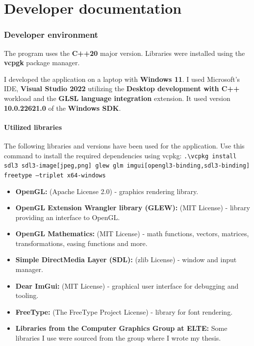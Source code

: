 \part{Developer documentation}
\label{impl}

\section{Developer environment}

The program uses the \textbf{C++20} major version. Libraries were installed using the \textbf{vcpgk} package manager.

I developed the application on a laptop with \textbf{Windows 11}. I used Microsoft's IDE, \textbf{Visual Studio 2022} utilizing the \textbf{Desktop development with C++} workload and the \textbf{GLSL language integration} extension. It used version \textbf{10.0.22621.0} of the \textbf{Windows SDK}.

\subsection{Utilized libraries}

The following libraries and versions have been used for the application. Use this command to install the required dependencies using vcpkg: \texttt{.\textbackslash vcpkg install sdl3 sdl3-image[jpeg,png] glew glm imgui[opengl3-binding,sdl3-binding] freetype --triplet x64-windows}

\begin{itemize}
    \item \textbf{OpenGL:} (Apache License 2.0) - graphics rendering library.
    \item \textbf{OpenGL Extension Wrangler library (GLEW):} (MIT License) - library providing an interface to OpenGL.
    \item \textbf{OpenGL Mathematics:} (MIT License) - math functions, vectors, matrices, transformations, easing functions and more.
    \item \textbf{Simple DirectMedia Layer (SDL):} (zlib License) - window and input manager.
    \item \textbf{Dear ImGui:} (MIT License) - graphical user interface for debugging and tooling.
    \item \textbf{FreeType:} (The FreeType Project License) - library for font rendering.
    \item \textbf{Libraries from the Computer Graphics Group at ELTE:} Some libraries I use were sourced from the group where I wrote my thesis.
\end{itemize}

